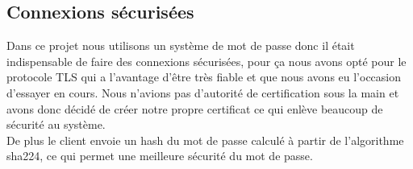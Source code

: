 \documentclass[12pt]{article}
\begin{document}
\subsection{Connexions sécurisées}
Dans ce projet nous utilisons un système de mot de passe donc il était indispensable de faire des connexions sécurisées, pour ça nous avons opté pour le protocole TLS qui a l'avantage d'être très fiable et  que nous avons eu l'occasion d'essayer en cours. Nous n'avions pas d'autorité de certification sous la main et avons donc décidé de créer notre propre certificat ce qui enlève beaucoup de sécurité au système. \\
De plus le client envoie un hash du mot de passe calculé à partir de l'algorithme sha224, ce qui permet une meilleure sécurité du mot de passe.
\end{document}
